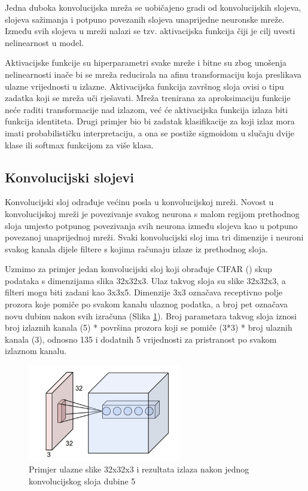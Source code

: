 \documentclass[times, utf8, proizvoljni, numeric]{fer}
\begin{document}
Jedna duboka konvolucijska mreža se uobičajeno gradi od konvolucijskih slojeva, slojeva sažimanja i potpuno povezanih slojeva unaprijedne neuronske mreže. Između svih slojeva u mreži nalazi se tzv. aktivacijska funkcija čiji je cilj uvesti nelinearnost u model.

Aktivacijske funkcije su hiperparametri svake mreže i bitne su zbog unošenja nelinearnosti inače bi se mreža reducirala na afinu transformaciju koja preslikava ulazne vrijednosti u izlazne. Aktivacijska funkcija završnog sloja ovisi o tipu zadatka koji se mreža uči rješavati. Mreža trenirana za aproksimaciju funkcije neće raditi transformacije nad izlazom, već će aktivacijska funkcija izlaza biti funkcija identiteta. Drugi primjer bio bi zadatak klasifikacije za koji izlaz mora imati probabilističku interpretaciju, a ona se postiže sigmoidom u slučaju dvije klase ili softmax funkcijom za više klasa. 


\subsection{Konvolucijski slojevi}

Konvolucijski sloj odrađuje većinu posla u konvolucijskoj mreži. Novost u konvolucijskoj mreži je povezivanje svakog neurona s malom regijom prethodnog sloja umjesto potpunog povezivanja svih neurona između slojeva kao u potpuno povezanoj unaprijednoj mreži. Svaki konvolucijski sloj ima tri dimenzije i neuroni svakog kanala dijele filtere s kojima računaju izlaze iz prethodnog sloja.

Uzmimo za primjer jedan konvolucijski sloj koji obrađuje CIFAR (\cite{CIFAR10}) skup podataka s dimenzijama slika 32x32x3. Ulaz takvog sloja su slike 32x32x3, a filteri mogu biti zadani kao 3x3x5. Dimenzije 3x3 označava receptivno polje prozora koje pomiče po svakom kanalu ulaznog podatka, a broj pet označava novu dubinu nakon svih izračuna (Slika \ref{fg:konvolucijski_sloj}). Broj parametara takvog sloja iznosi broj izlaznih kanala (5) * površina prozora koji se pomiče (3*3) * broj ulaznih kanala (3), odnosno 135 i dodatnih 5 vrijednosti za pristranost po svakom izlaznom kanalu.

\begin{figure}[!ht]
	\begin{center}
		\captionsetup{justification=centering}
		\includegraphics[width=0.6\textwidth]{./imgs/konvolucijski_sloj.png}
		\caption{Primjer ulazne slike 32x32x3 i rezultata izlaza nakon jednog konvolucijskog sloja dubine 5 \cite{CS231n}}
		\label{fg:konvolucijski_sloj}
	\end{center}
\end{figure}
\end{document}
